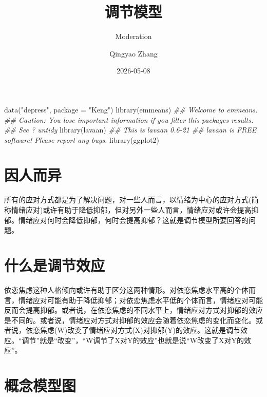 \documentclass[
  chinese-hans,
  letterpaper,
  DIV=11,
  numbers=noendperiod]{scrartcl}
\title{调节模型}
\subtitle{Moderation}
\author{Qingyao Zhang}
\date{2026-05-08}
\newenvironment{Shaded}{\begin{snugshade}}{\end{snugshade}}
\newcommand{\AttributeTok}[1]{\textcolor[rgb]{0.40,0.45,0.13}{#1}}
\newcommand{\DocumentationTok}[1]{\textcolor[rgb]{0.37,0.37,0.37}{\textit{#1}}}
\newcommand{\FunctionTok}[1]{\textcolor[rgb]{0.28,0.35,0.67}{#1}}
\newcommand{\NormalTok}[1]{\textcolor[rgb]{0.00,0.23,0.31}{#1}}
\newcommand{\StringTok}[1]{\textcolor[rgb]{0.13,0.47,0.30}{#1}}
\renewcommand*\contentsname{目录}
\newcommand\contentsname{目录}
\begin{document}
\maketitle

\renewcommand*\contentsname{目录}
{
\setcounter{tocdepth}{3}
\tableofcontents
}

\begin{Shaded}
\begin{Highlighting}[numbers=left,,]
\FunctionTok{data}\NormalTok{(}\StringTok{"depress"}\NormalTok{, }\AttributeTok{package =} \StringTok{"Keng"}\NormalTok{)}
\FunctionTok{library}\NormalTok{(emmeans)}
\DocumentationTok{\#\# Welcome to emmeans.}
\DocumentationTok{\#\# Caution: You lose important information if you filter this package\textquotesingle{}s results.}
\DocumentationTok{\#\# See \textquotesingle{}? untidy\textquotesingle{}}
\FunctionTok{library}\NormalTok{(lavaan)}
\DocumentationTok{\#\# This is lavaan 0.6{-}21}
\DocumentationTok{\#\# lavaan is FREE software! Please report any bugs.}
\FunctionTok{library}\NormalTok{(ggplot2)}
\end{Highlighting}
\end{Shaded}

\section{因人而异}\label{ux56e0ux4ebaux800cux5f02}

所有的应对方式都是为了解决问题，对一些人而言，以情绪为中心的应对方式(简称情绪应对)或许有助于降低抑郁，但对另外一些人而言，情绪应对或许会提高抑郁。情绪应对何时会降低抑郁，何时会提高抑郁？这就是调节模型所要回答的问题。

\section{什么是调节效应}\label{ux4ec0ux4e48ux662fux8c03ux8282ux6548ux5e94}

依恋焦虑这种人格倾向或许有助于区分这两种情形。对依恋焦虑水平{高}的个体而言，情绪应对可能有助于{降低}抑郁；对依恋焦虑水平{低}的个体而言，情绪应对可能反而会{提高}抑郁。或者说，在依恋焦虑的不同水平上，情绪应对方式对抑郁的效应是不同的。或者说，情绪应对方式对抑郁的效应会随着依恋焦虑的变化而变化。或者说，依恋焦虑(W)改变了情绪应对方式(X)对抑郁(Y)的效应。这就是调节效应。``调节''就是``改变''，``W调节了X对Y的效应''也就是说``W改变了X对Y的效应''。

\section{概念模型图}\label{ux6982ux5ff5ux6a21ux578bux56fe}
\end{document}
